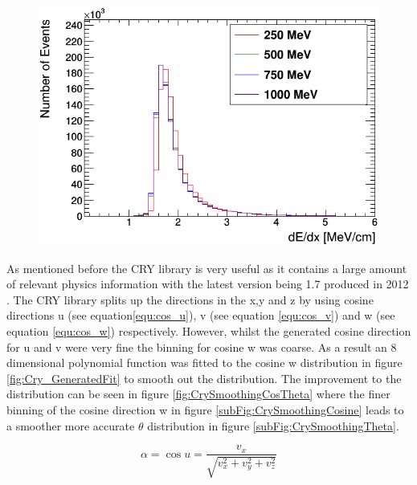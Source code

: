 \begin{figure}[htbp]
 \centering
 \includegraphics[width=0.7\linewidth]{Chapter4/Figs/Raster/year1Plots/muons_per_mev_cm.png}
 \label{fig:mev_per_cm_muons}
\end{figure}

As mentioned before the CRY library is very useful as it contains a large amount of relevant physics information with the latest version being 1.7 produced in 2012 \cite{hagmann2012cosmicCry}. The CRY library splits up the directions in the x,y and z by using cosine directions u (see equation\ref{equ:cos_u}), v (see equation \ref{equ:cos_v}) and w (see equation \ref{equ:cos_w}) respectively. However, whilst the generated cosine direction for u and v were very fine the binning for cosine w was coarse. As a result an 8 dimensional polynomial function was fitted to the cosine w distribution in figure \ref{fig:Cry_GeneratedFit} to smooth out the distribution. The improvement to the distribution can be seen in figure \ref{fig:CrySmoothingCosTheta} where the finer binning of the cosine direction w in figure \ref{subFig:CrySmoothingCosine} leads to a smoother more accurate $\theta$ distribution in figure \ref{subFig:CrySmoothingTheta}. 

\begin{equation}
\alpha = \cos{u} = \frac{v_x}{\sqrt{v_x^2+v_y^2+v_z^2}}
\label{equ:cos_u}
\end{equation}

